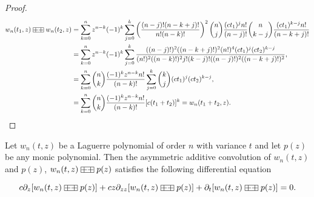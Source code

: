 \begin{proof}
    \begin{align*}
        w_n(t_1,z) \aac w_n(t_2,z) &= \sum_{k=0}^n z^{n-k}(-1)^k \sum_{j=0}^k \left(\frac{(n-j)!(n-k+j)!}{n!(n-k)!}\right)^2\binom{n}{j}\frac{(ct_1)^jn!}{(n-j)!}\binom{n}{k-j}\frac{(ct_1)^{k-j} n!}{(n-k+j)!}\\ 
        &= \sum_{k=0}^n z^{n-k}(-1)^k \sum_{j=0}^k \frac{((n-j)!)^2((n-k+j)!)^2(n!)^4(ct_1)^j(ct_2)^{k-j}}{(n!)^2((n-k)!)^2j!(k-j)!((n-j)!)^2((n-k+j)!)^2},\\ 
        &= \sum_{k=0}^n \binom{n}{k} \frac{(-1)^k z^{n-k}n!}{(n-k)!}\sum_{j=0}^k \binom{k}{j}(ct_1)^j(ct_2)^{k-j}, \\  
        &=  \sum_{k=0}^n \binom{n}{k} \frac{(-1)^k z^{n-k}n!}{(n-k)!}[c(t_1 + t_2)]^k = w_n(t_1 + t_2, z).
    \end{align*}
\end{proof}

\begin{theorem}
    Let $w_n(t,z)$ be a Laguerre polynomial of order $n$ with variance $t$ and let $p(z)$ be any monic polynomial. Then the asymmetric additive convolution of $w_n(t,z)$ and $p(z)$, $w_n(t,z) \aac p(z)$ satisfies the following differential equation

    \begin{equation*}
        c\partial_z [w_n(t,z) \aac p(z)] + cz \partial_{zz}[w_n(t,z) \aac p(z)] + \partial_t [w_n(t,z) \aac p(z)] = 0.
    \end{equation*}
\end{theorem}


